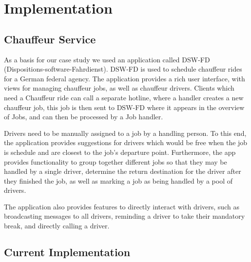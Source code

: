 \chapter{Implementation}

\section{Chauffeur Service}


As a basis for our case study we used an application called DSW-FD (Dispositions-software-Fahrdienst). DSW-FD is used to schedule chauffeur rides for a German federal agency. The application provides a rich user interface, with views for managing chauffeur jobs, as well as chauffeur drivers. Clients which need a Chauffeur ride can call a separate hotline, where a handler creates a new chauffeur job, this job is then sent to DSW-FD where it appears in the overview of Jobs, and can then be processed by a Job handler.

Drivers need to be manually assigned to a job by a handling person. To this end, the application provides suggestions for drivers which would be free when the job is schedule and are closest to the job's departure point. Furthermore, the app provides functionality to group together different jobs so that they may be handled by a single driver, determine the return destination for the driver after they finished the job, as well as marking a job as being handled by a pool of drivers.

The application also provides features to directly interact with drivers, such as broadcasting messages to all drivers, reminding a driver to take their mandatory break, and directly calling a driver.

\section{Current Implementation}

